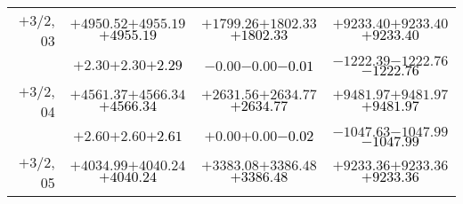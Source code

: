 \documentclass[compress]{beamer}
\begin{document}
\begin{frame}
{\begin{tabular}{r | c | c | c}
$+$3/2, 03 & $+4950.52$\hspace{0.1 cm}$+4955.19$\hspace{0.1 cm}\textcolor{black}{$+4955.19$} & $+1799.26$\hspace{0.1 cm}$+1802.33$\hspace{0.1 cm}\textcolor{black}{$+1802.33$} & $+9233.40$\hspace{0.1 cm}$+9233.40$\hspace{0.1 cm}\textcolor{black}{$+9233.40$} \\
           & $+2.30$\hspace{0.1 cm}$+2.30$\hspace{0.1 cm}\textcolor{black}{$+2.29$} & $-0.00$\hspace{0.1 cm}$-0.00$\hspace{0.1 cm}\textcolor{black}{$-0.01$} & $-1222.39$\hspace{0.1 cm}$-1222.76$\hspace{0.1 cm}\textcolor{black}{$-1222.76$} \\
$+$3/2, 04 & $+4561.37$\hspace{0.1 cm}$+4566.34$\hspace{0.1 cm}\textcolor{black}{$+4566.34$} & $+2631.56$\hspace{0.1 cm}$+2634.77$\hspace{0.1 cm}\textcolor{black}{$+2634.77$} & $+9481.97$\hspace{0.1 cm}$+9481.97$\hspace{0.1 cm}\textcolor{black}{$+9481.97$} \\
           & $+2.60$\hspace{0.1 cm}$+2.60$\hspace{0.1 cm}\textcolor{black}{$+2.61$} & $+0.00$\hspace{0.1 cm}$+0.00$\hspace{0.1 cm}\textcolor{black}{$-0.02$} & $-1047.63$\hspace{0.1 cm}$-1047.99$\hspace{0.1 cm}\textcolor{black}{$-1047.99$} \\
$+$3/2, 05 & $+4034.99$\hspace{0.1 cm}$+4040.24$\hspace{0.1 cm}\textcolor{black}{$+4040.24$} & $+3383.08$\hspace{0.1 cm}$+3386.48$\hspace{0.1 cm}\textcolor{black}{$+3386.48$} & $+9233.36$\hspace{0.1 cm}$+9233.36$\hspace{0.1 cm}\textcolor{black}{$+9233.36$} \\

\end{tabular}}
\end{frame}
\end{document}
